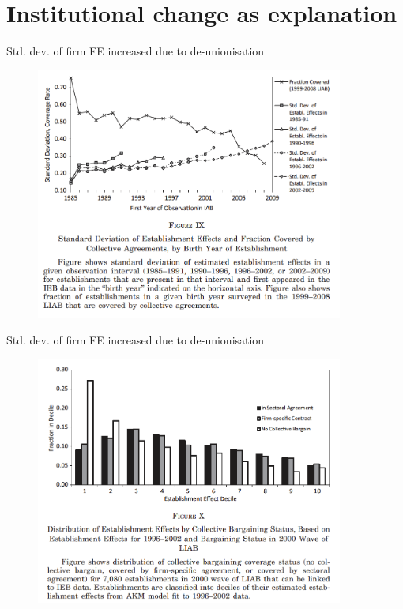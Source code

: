 \documentclass[notes=show]{beamer}
\begin{document}
\section{Institutional change as explanation}

\begin{frame}{Std. dev. of firm FE increased due to de-unionisation}
\begin{figure}[p!]
 \includegraphics[width=0.9\textwidth]{figures/Fig9} 
\end{figure}
\end{frame}

\begin{frame}{Std. dev. of firm FE increased due to de-unionisation}
\begin{figure}[p!]
 \includegraphics[width=0.9\textwidth]{figures/Fig10} 
\end{figure}
\end{frame}
\end{document}
